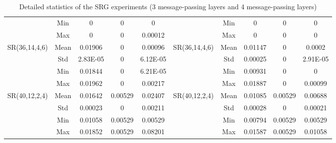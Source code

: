 \documentclass[letterpaper]{article} \usepackage{aaai24}  \usepackage{times}  \usepackage{helvet}  \usepackage{courier}  \usepackage[hyphens]{url}  \usepackage{graphicx} \urlstyle{rm} \def\UrlFont{\rm}  \usepackage{natbib}  \usepackage{caption} \frenchspacing  \setlength{\pdfpagewidth}{8.5in} \setlength{\pdfpageheight}{11in} \usepackage{algorithm}
\begin{document}
\begin{table*}[t]
{\begin{tabular}{@{}ccccc|ccccc@{}}
\multicolumn{1}{c|}{}                               & \multicolumn{1}{c|}{Min}  & 0         & 0         & 0        & \multicolumn{1}{c|}{}                               & \multicolumn{1}{c|}{Min}  & 0         & 0         & 0        \\
\multicolumn{1}{c|}{}                               & \multicolumn{1}{c|}{Max}  & 0         & 0         & 0.00012  & \multicolumn{1}{c|}{}                               & \multicolumn{1}{c|}{Max}  & 0         & 0         & 0        \\ \midrule
\multicolumn{1}{c|}{\multirow{4}{*}{SR(36,14,4,6)}} & \multicolumn{1}{c|}{Mean} & 0.01906   & 0         & 0.00096  & \multicolumn{1}{c|}{\multirow{4}{*}{SR(36,14,4,6)}} & \multicolumn{1}{c|}{Mean} & 0.01147   & 0         & 0.0002   \\
\multicolumn{1}{c|}{}                               & \multicolumn{1}{c|}{Std}  & 2.83E-05  & 0         & 6.12E-05 & \multicolumn{1}{c|}{}                               & \multicolumn{1}{c|}{Std}  & 0.00025   & 0         & 2.91E-05 \\
\multicolumn{1}{c|}{}                               & \multicolumn{1}{c|}{Min}  & 0.01844   & 0         & 6.21E-05 & \multicolumn{1}{c|}{}                               & \multicolumn{1}{c|}{Min}  & 0.00931   & 0         & 0        \\
\multicolumn{1}{c|}{}                               & \multicolumn{1}{c|}{Max}  & 0.01962   & 0         & 0.00217  & \multicolumn{1}{c|}{}                               & \multicolumn{1}{c|}{Max}  & 0.01887   & 0         & 0.00099  \\ \midrule
\multicolumn{1}{c|}{\multirow{4}{*}{SR(40,12,2,4)}} & \multicolumn{1}{c|}{Mean} & 0.01642   & 0.00529   & 0.02407  & \multicolumn{1}{c|}{\multirow{4}{*}{SR(40,12,2,4)}} & \multicolumn{1}{c|}{Mean} & 0.01085   & 0.00529   & 0.00688  \\
\multicolumn{1}{c|}{}                               & \multicolumn{1}{c|}{Std}  & 0.00023   & 0         & 0.00211  & \multicolumn{1}{c|}{}                               & \multicolumn{1}{c|}{Std}  & 0.00028   & 0         & 0.00021  \\
\multicolumn{1}{c|}{}                               & \multicolumn{1}{c|}{Min}  & 0.01058   & 0.00529   & 0.00529  & \multicolumn{1}{c|}{}                               & \multicolumn{1}{c|}{Min}  & 0.00794   & 0.00529   & 0.00529  \\
\multicolumn{1}{c|}{}                               & \multicolumn{1}{c|}{Max}  & 0.01852   & 0.00529   & 0.08201  & \multicolumn{1}{c|}{}                               & \multicolumn{1}{c|}{Max}  & 0.01587   & 0.00529   & 0.01058  \\ \bottomrule
\end{tabular}}
\caption{Detailed statistics of the SRG experiments (3 message-passing layers and 4 message-passing layers)}
\label{tab:details-sr-a}
\end{table*}
\end{document}
